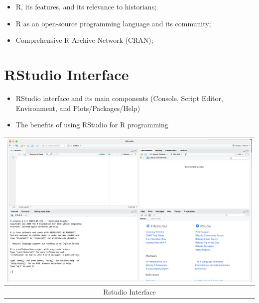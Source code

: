 \documentclass[
]{book}
\providecommand{\tightlist}{%
  \setlength{\itemsep}{0pt}\setlength{\parskip}{0pt}}
\begin{document}
\begin{itemize}
\tightlist
\item
  R, its features, and its relevance to historians;
\item
  R as an open-source programming language and its community;
\item
  Comprehensive R Archive Network (CRAN);
\end{itemize}

\hypertarget{rstudio-interface}{%
\section{RStudio Interface}\label{rstudio-interface}}

\begin{itemize}
\tightlist
\item
  RStudio interface and its main components (Console, Script Editor, Environment, and Plots/Packages/Help)
\item
  The benefits of using RStudio for R programming
\end{itemize}

\begin{longtable}[]{@{}c@{}}
\toprule\noalign{}
\includegraphics{./images/r_instructions/RStudio.png} \\
\midrule\noalign{}
\endhead
\bottomrule\noalign{}
\endlastfoot
Rstudio Interface \\
\end{longtable}
\end{document}
